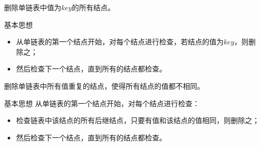 \begin{frame}[fragile]
\begin{wenti}
删除单链表中值为$key$的所有结点。
\end{wenti}
\pause 
\textcolor{acolor5}{基本思想}
\begin{itemize}
\item
从单链表的第一个结点开始，对每个结点进行检查，若结点的值为$key$，则删除之；
\item
然后检查下一个结点，直到所有的结点都检查。
\end{itemize}

\end{frame}

\begin{frame}[fragile]

\end{frame}

\begin{frame}[fragile]

\end{frame}



\begin{frame}[fragile]
\begin{wenti}
删除单链表中所有值重复的结点，使得所有结点的值都不相同。
\end{wenti}
\pause 
\textcolor{acolor5}{基本思想}
从单链表的第一个结点开始，对每个结点进行检查：
\begin{itemize}
\item
检查链表中该结点的所有后继结点，只要有值和该结点的值相同，则删除之；
\item
然后检查下一个结点，直到所有的结点都检查。
\end{itemize}
\end{frame}



\begin{frame}[fragile]

\end{frame}

\begin{frame}[fragile]

\end{frame}

